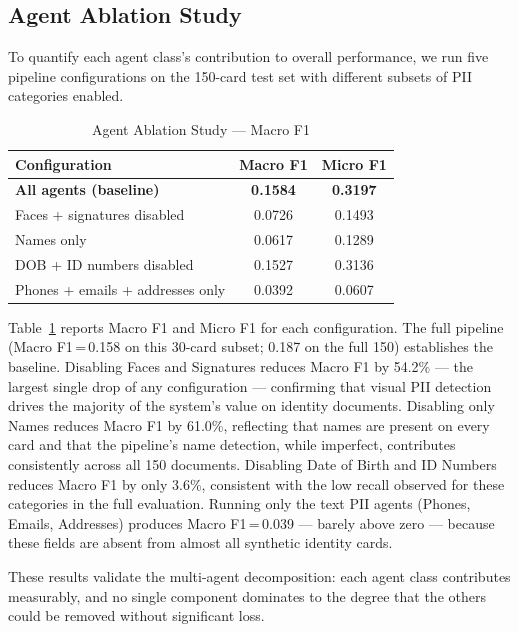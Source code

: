 \documentclass[conference]{IEEEtran}
\begin{document}
\subsection{Agent Ablation Study}
\label{sec:ablation}

To quantify each agent class's contribution to
overall performance, we run five pipeline
configurations on the 150-card test set with
different subsets of PII categories enabled.

\begin{table}[h]\centering
\caption{Agent Ablation Study --- Macro F1}
\label{tab:ablation}
\begin{tabular}{lcc}
\toprule
Configuration & Macro F1 & Micro F1 \\
\midrule
\textbf{All agents (baseline)} & \textbf{0.1584} & \textbf{0.3197} \\
Faces + signatures disabled & 0.0726 & 0.1493 \\
Names only & 0.0617 & 0.1289 \\
DOB + ID numbers disabled & 0.1527 & 0.3136 \\
Phones + emails + addresses only & 0.0392 & 0.0607 \\
\bottomrule
\end{tabular}
\end{table}

Table~\ref{tab:ablation} reports Macro F1 and
Micro F1 for each configuration.
The full pipeline (Macro F1\,=\,0.158 on this
30-card subset; 0.187 on the full 150) establishes
the baseline.
Disabling Faces and Signatures reduces Macro F1 by
54.2\% --- the largest single drop of any
configuration --- confirming that visual PII
detection drives the majority of the system's value
on identity documents.
Disabling only Names reduces Macro F1 by 61.0\%,
reflecting that names are present on every card
and that the pipeline's name detection, while
imperfect, contributes consistently across all
150 documents.
Disabling Date of Birth and ID Numbers reduces
Macro F1 by only 3.6\%, consistent with the
low recall observed for these categories
in the full evaluation.
Running only the text PII agents (Phones, Emails,
Addresses) produces Macro F1\,=\,0.039 ---
barely above zero --- because these fields are
absent from almost all synthetic identity cards.

These results validate the multi-agent decomposition:
each agent class contributes measurably, and no
single component dominates to the degree that the
others could be removed without significant loss.
\end{document}
